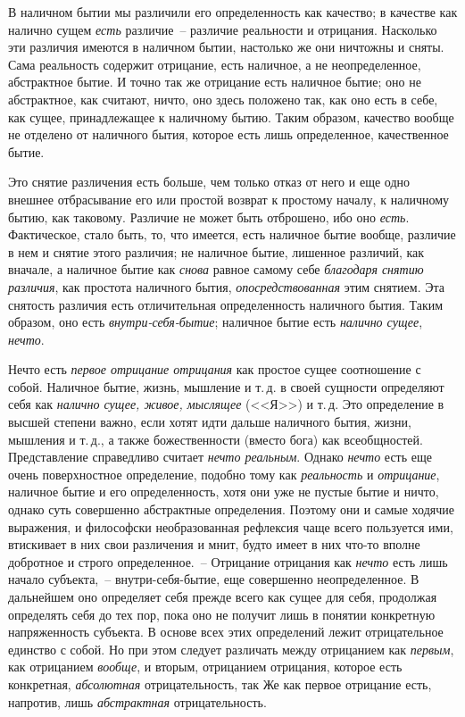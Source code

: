 В наличном бытии мы различили его определенность
как качество; в качестве как налично сущем \emph{есть} различие~--
различие реальности и отрицания. Насколько
эти различия имеются в наличном бытии, настолько же
они ничтожны и сняты. Сама реальность содержит отрицание,
есть наличное, а не неопределенное, абстрактное
бытие. И точно так же отрицание есть наличное бытие;
оно не абстрактное, как считают, ничто, оно здесь положено
так, как оно есть в себе, как сущее, принадлежащее
к наличному бытию. Таким образом, качество вообще не
отделено от наличного бытия, которое есть лишь определенное,
качественное бытие.

Это снятие различения есть больше, чем только отказ
от него и еще одно внешнее отбрасывание его или простой
возврат к простому началу, к наличному бытию,
как таковому. Различие не может быть отброшено, ибо
оно \emph{есть}. Фактическое, стало быть, то, что имеется, есть
наличное бытие вообще, различие в нем и снятие этого
различия; не наличное бытие, лишенное различий, как
вначале, а наличное бытие как \emph{снова} равное самому себе
\emph{благодаря снятию различия}, как простота наличного
бытия, \emph{опосредствованная} этим снятием. Эта снятость
различия есть отличительная определенность наличного
бытия. Таким образом, оно есть \emph{внутри-себя-бытие}; наличное
бытие есть \emph{налично сущее}, \emph{нечто}.

Нечто есть \emph{первое отрицание отрицания} как простое
сущее соотношение с собой. Наличное бытие, жизнь,
мышление и т.\,д. в своей сущности определяют себя как
\emph{налично сущее, живое, мыслящее} (<<Я>>) и т.\,д. Это определение
в высшей степени важно, если хотят идти дальше
наличного бытия, жизни, мышления и т.\,д., а также
божественности (вместо бога) как всеобщностей. Представление
справедливо считает \emph{нечто реальным}. Однако
\emph{нечто} есть еще очень поверхностное определение, подобно
тому как \emph{реальность} и \emph{отрицание}, наличное бытие и
его определенность, хотя они уже не пустые бытие и
ничто, однако суть совершенно абстрактные определения.
Поэтому они и самые ходячие выражения, и философски
необразованная рефлексия чаще всего пользуется
ими, втискивает в них свои различения и мнит, будто
имеет в них что-то вполне добротное и строго определенное.~--
Отрицание отрицания как \emph{нечто} есть лишь начало
субъекта,~-- внутри-себя-бытие, еще совершенно неопределенное.
В дальнейшем оно определяет себя прежде
всего как сущее для себя, продолжая определять себя до
тех пор, пока оно не получит лишь в понятии конкретную
напряженность субъекта. В основе всех этих определений
лежит отрицательное единство с собой. Но при этом
следует различать между отрицанием как \emph{первым}, как
отрицанием \emph{вообще}, и вторым, отрицанием отрицания,
которое есть конкретная, \emph{абсолютная} отрицательность,
так Же как первое отрицание есть, напротив, лишь
\emph{абстрактная} отрицательность.

